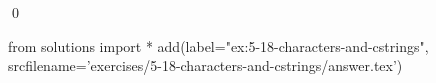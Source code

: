 
\begin{ex}
  \label{ex:5-18-characters-and-cstrings}
  
  \qed
\end{ex}
\begin{python0}
from solutions import *
add(label="ex:5-18-characters-and-cstrings",
    srcfilename='exercises/5-18-characters-and-cstrings/answer.tex')
\end{python0}
